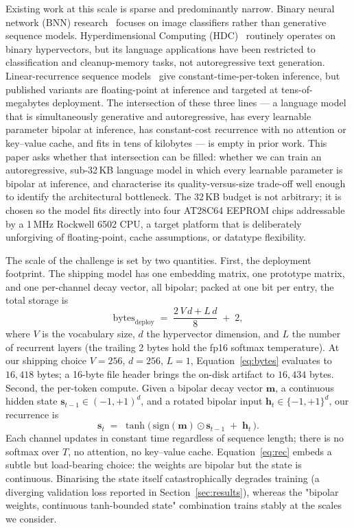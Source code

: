 \documentclass[runningheads]{llncs}
\newcommand{\bipset}{\{-1,+1\}}
\newcommand{\bm}{\mathbf{m}}
\newcommand{\bh}{\mathbf{h}}
\newcommand{\bs}{\mathbf{s}}
\begin{document}
Existing work at this scale is sparse and predominantly narrow. Binary
neural network (BNN)
research~\cite{courbariaux2016binaryconnect,qin2020binary} focuses on image
classifiers rather than generative sequence models. Hyperdimensional
Computing (HDC)~\cite{kanerva2009hyperdimensional,plate1995holographic}
routinely operates on binary hypervectors, but its language applications
have been restricted to classification and cleanup-memory tasks, not
autoregressive text generation. Linear-recurrence sequence
models~\cite{peng2023rwkv,gu2022s4,gu2023mamba} give constant-time-per-token
inference, but published variants are floating-point at inference and
targeted at tens-of-megabytes deployment. The intersection of these three
lines --- a language model that is simultaneously generative and
autoregressive, has every learnable parameter bipolar at inference, has
constant-cost recurrence with no attention or key--value cache, and fits
in tens of kilobytes --- is empty in prior work. This paper asks whether
that intersection can be filled: whether we can train an autoregressive,
sub-32\,KB language model in which every learnable parameter is bipolar at
inference, and characterise its quality-versus-size trade-off well enough
to identify the architectural bottleneck. The 32\,KB budget is not
arbitrary; it is chosen so the model fits directly into four AT28C64
EEPROM chips addressable by a 1\,MHz Rockwell 6502 CPU, a target platform
that is deliberately unforgiving of floating-point, cache assumptions, or
datatype flexibility.

The scale of the challenge is set by two quantities. First, the deployment
footprint. The shipping model has one embedding matrix, one prototype
matrix, and one per-channel decay vector, all bipolar; packed at one bit
per entry, the total storage is
\begin{equation}
\text{bytes}_{\text{deploy}} \;=\; \frac{2\,V\,d + L\,d}{8} \;+\; 2,
\label{eq:bytes}
\end{equation}
where $V$ is the vocabulary size, $d$ the hypervector dimension, and $L$
the number of recurrent layers (the trailing 2 bytes hold the fp16
softmax temperature). At our shipping choice $V{=}256$, $d{=}256$,
$L{=}1$, Equation~\ref{eq:bytes} evaluates to $16{,}418$ bytes; a 16-byte
file header brings the on-disk artifact to $16{,}434$ bytes. Second, the
per-token compute. Given a bipolar decay vector $\bm$, a continuous hidden
state $\bs_{t-1} \in (-1,+1)^{d}$, and a rotated bipolar input
$\bh_t \in \bipset^{d}$, our recurrence is
\begin{equation}
\bs_t \;=\; \tanh\!\bigl(\,\mathrm{sign}(\bm) \odot \bs_{t-1} \;+\; \bh_t\,\bigr).
\label{eq:rec}
\end{equation}
Each channel updates in constant time regardless of sequence length; there
is no softmax over $T$, no attention, no key--value cache.
Equation~\ref{eq:rec} embeds a subtle but load-bearing choice: the weights
are bipolar but the state is continuous. Binarising the state itself
catastrophically degrades training (a diverging validation loss reported
in Section~\ref{sec:results}), whereas the "bipolar weights, continuous
tanh-bounded state" combination trains stably at the scales we consider.
\end{document}
